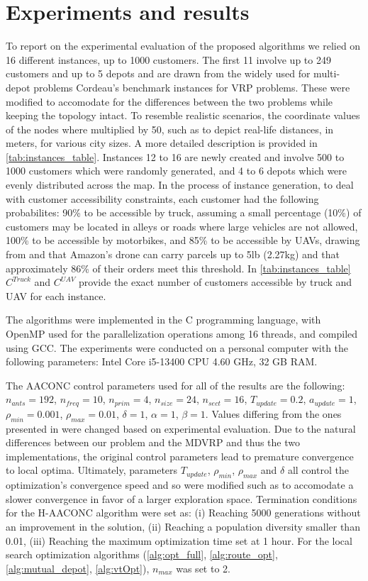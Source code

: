 \documentclass{article}
\begin{document}
	\section{Experiments and results}
	To report on the experimental evaluation of the proposed algorithms we relied on 16 different instances, up to 1000 customers. The first 11 involve up to 249 customers and up to 5 depots and are drawn from the widely used for multi-depot problems Cordeau's \cite{Cordeau1997} benchmark instances for VRP problems. These were modified to accomodate for the differences between the two problems while keeping the topology intact. To resemble realistic scenarios, the coordinate values of the nodes where multiplied by 50, such as to depict real-life distances, in meters, for various city sizes. A more detailed description is provided in \autoref{tab:instances_table}. Instances 12 to 16 are newly created and involve 500 to 1000 customers which were randomly generated, and 4 to 6 depots which were evenly distributed across the map. In the process of instance generation, to deal with customer accessibility constraints, each customer had the following probabilites: 90\% to be accessible by truck, assuming a small percentage (10\%) of customers may be located in alleys or roads where large vehicles are not allowed, 100\% to be accessible by motorbikes, and 85\% to be accessible by UAVs, drawing from \cite{Sacramento2019} and \cite{Allain2013} that Amazon's drone can carry parcels up to 5lb (2.27kg) and that approximately 86\% of their orders meet this threshold. In \autoref{tab:instances_table} $C^{Truck}$ and $C^{UAV}$  provide the exact number of customers accessible by truck and UAV for each instance.
	
	\par
	The algorithms were implemented in the C programming language, with OpenMP used for the parallelization operations among 16 threads, and compiled using GCC. The experiments were conducted on a personal computer with the following parameters: Intel Core i5-13400 CPU 4.60 GHz, 32 GB RAM.
	\par
	The AACONC control parameters used for all of the results are the following: $n_{ants} = 192$, $n_{freq} = 10$, $n_{prim} = 4$, $n_{size} = 24$, $n_{sect} = 16$, $T_{update} = 0.2$, $a_{update} = 1$, $\rho_{min} = 0.001$, $\rho_{max} = 0.01$, $\delta = 1$, $\alpha = 1$, $\beta = 1$. Values differing from the ones presented in \parencite{Stodola2022} were changed based on experimental evaluation.
	Due to the natural differences between our problem and the MDVRP and thus the two implementations, the original control parameters lead to premature convergence to local optima. Ultimately, parameters $T_{update}$, $\rho_{min}$, $\rho_{max}$ and $\delta$ all control the optimization's convergence speed and so were modified such as to accomodate a slower convergence in favor of a larger exploration space. Termination conditions for the H-AACONC algorithm were set as: (i) Reaching 5000 generations without an improvement in the solution, (ii) Reaching a population diversity smaller than 0.01, (iii) Reaching the maximum optimization time set at 1 hour.
	For the local search optimization algorithms (\ref{alg:opt_full}, \ref{alg:route_opt}, \ref{alg:mutual_depot}, \ref{alg:vtOpt}), $n_{max}$ was set to 2.
	\par
\end{document}
